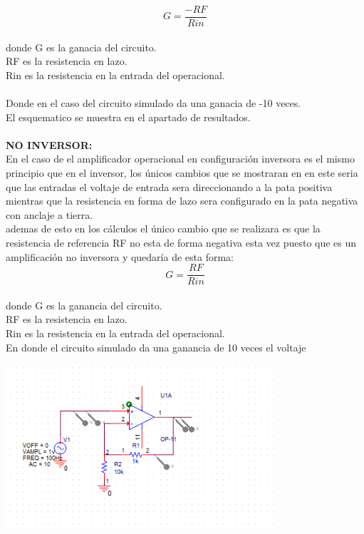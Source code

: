 \documentclass[12pt,a4paper]{article}
\begin{document}
$$G=\frac{-RF}{Rin}$$\\
donde G es la ganacia del circuito.\\
RF es la resistencia en lazo.\\
Rin es la resistencia en la entrada del operacional.
\\\\Donde en el caso del circuito simulado da una ganacia de -10 veces.\\
El esquematico se muestra en el apartado de resultados.\\\\

\textbf{NO INVERSOR:\\}
En el caso de el amplificador operacional en configuración inversora es el mismo principio que en el inversor, los únicos cambios que se mostraran en en este seria que las entradas el voltaje de entrada sera direccionando a la pata positiva mientras que la resistencia en forma de lazo sera configurado en la pata negativa con anclaje a tierra.\\
ademas de esto en los cálculos el único cambio que se realizara es que la resistencia de referencia RF no esta de forma negativa esta vez puesto que es un amplificación no inversora y quedaría de esta forma:\\
$$G= \frac{RF}{Rin}$$\\
donde G es la ganancia del circuito.\\
RF es la resistencia en lazo.\\
Rin es la resistencia en la entrada del operacional.\\
En donde el circuito simulado da una ganancia de 10 veces el voltaje\\

\begin{center}
\includegraphics[width=10cm]{Simulaciones/noinver.png} 
\end{center}
\end{document}
